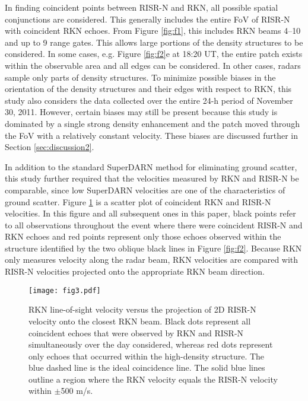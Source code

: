 In finding coincident points between RISR-N and RKN, all possible spatial conjunctions are considered.  This generally includes the entire FoV of RISR-N with coincident RKN echoes.  From Figure \ref{fig:f1}, this includes RKN beams 4--10 and up to 9 range gates.  This allows large portions of the density structures to be considered.  In some cases, e.g. Figure \ref{fig:f2}e at 18:20 UT, the entire patch exists within the observable area and all edges can be considered.  In other cases, radars sample only parts of density structures.  To minimize possible biases in the orientation of the density structures and their edges with respect to RKN, this study also considers the data collected over the entire 24-h period of November 30, 2011.  However, certain biases may still be present because this study is dominated by a single strong density enhancement and the patch moved through the FoV with a relatively constant velocity.  These biases are discussed further in Section \ref{sec:discussion2}.

\label{sec:velocity}
In addition to the standard SuperDARN method for eliminating ground scatter, this study further required that the velocities measured by RKN and RISR-N be comparable, since low SuperDARN velocities are one of the characteristics of ground scatter.  Figure \ref{fig:f3} is a scatter plot of coincident RKN and RISR-N velocities.  In this figure and all subsequent ones in this paper, black points refer to all observations throughout the event where there were coincident RISR-N and RKN echoes and red points represent only those echoes observed within the structure identified by the two oblique black lines in Figure \ref{fig:f2}.  Because RKN only measures velocity along the radar beam, RKN velocities are compared with RISR-N velocities projected onto the appropriate RKN beam direction.

\begin{figure}
	\texttt{[image: fig3.pdf]}
  \caption{RKN line-of-sight velocity versus the projection of 2D RISR-N velocity onto the closest RKN beam. Black dots represent all coincident echoes that were observed by RKN and RISR-N simultaneously over the day considered, whereas red dots represent only echoes that occurred within the high-density structure.  The blue dashed line is the ideal coincidence line. The solid blue lines outline a region where the RKN velocity equals the RISR-N velocity within \(\pm\)500 m/s.}
  \label{fig:f3}
\end{figure}

